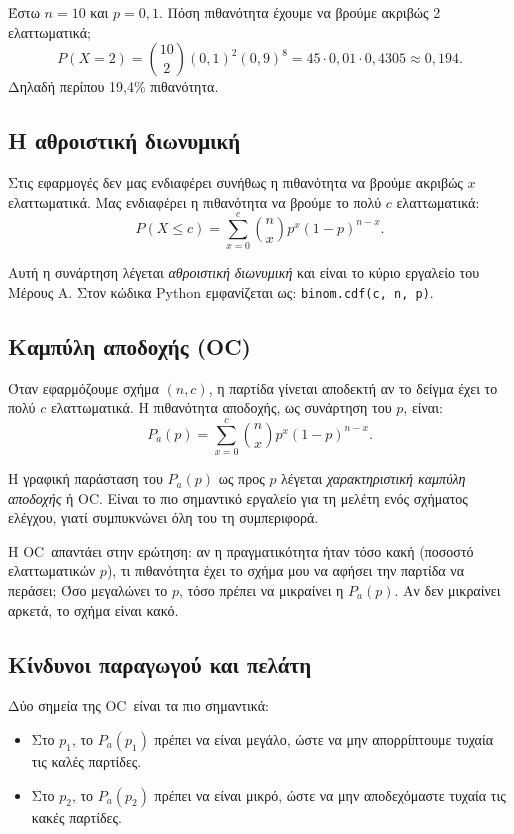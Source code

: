 \documentclass[12pt,a4paper]{article}
\newcommand{\code}[1]{\texttt{\textenglish{#1}}}
\newcommand{\Pa}{P_{\!a}}
\newcommand{\OC}{\textenglish{OC}}
\begin{document}
\begin{example}
Έστω \(n=10\) και \(p=0{,}1\). Πόση πιθανότητα έχουμε να βρούμε ακριβώς 2
ελαττωματικά;
\[
    P(X=2)=\binom{10}{2}(0{,}1)^2(0{,}9)^8
    =45\cdot 0{,}01\cdot 0{,}4305
    \approx 0{,}194.
\]
Δηλαδή περίπου 19,4\% πιθανότητα.
\end{example}

\subsection{Η αθροιστική διωνυμική}

Στις εφαρμογές δεν μας ενδιαφέρει συνήθως η πιθανότητα να βρούμε ακριβώς
\(x\) ελαττωματικά. Μας ενδιαφέρει η πιθανότητα να βρούμε το πολύ \(c\)
ελαττωματικά:
\[
    P(X\le c)=\sum_{x=0}^{c}\binom{n}{x}p^{x}(1-p)^{n-x}.
\]

Αυτή η συνάρτηση λέγεται \emph{αθροιστική διωνυμική} και είναι το κύριο
εργαλείο του Μέρους Α. Στον κώδικα Python εμφανίζεται ως:
\code{binom.cdf(c, n, p)}.

\subsection{Καμπύλη αποδοχής (OC)}

Όταν εφαρμόζουμε σχήμα \((n,c)\), η παρτίδα γίνεται αποδεκτή αν το δείγμα
έχει το πολύ \(c\) ελαττωματικά. Η πιθανότητα αποδοχής, ως συνάρτηση του
\(p\), είναι:
\[
    \Pa(p)=\sum_{x=0}^{c}\binom{n}{x}p^{x}(1-p)^{n-x}.
\]

Η γραφική παράσταση του \(\Pa(p)\) ως προς \(p\) λέγεται \emph{χαρακτηριστική
καμπύλη αποδοχής} ή \OC. Είναι το πιο σημαντικό εργαλείο για τη μελέτη ενός
σχήματος ελέγχου, γιατί συμπυκνώνει όλη του τη συμπεριφορά.

\begin{intuition}
Η \OC\ απαντάει στην ερώτηση: αν η πραγματικότητα ήταν τόσο κακή
(ποσοστό ελαττωματικών \(p\)), τι πιθανότητα έχει το σχήμα μου να αφήσει
την παρτίδα να περάσει; Όσο μεγαλώνει το \(p\), τόσο πρέπει να μικραίνει
η \(\Pa(p)\). Αν δεν μικραίνει αρκετά, το σχήμα είναι κακό.
\end{intuition}

\subsection{Κίνδυνοι παραγωγού και πελάτη}

Δύο σημεία της \OC\ είναι τα πιο σημαντικά:

\begin{itemize}[leftmargin=2.2em]
    \item Στο \(p_1\), το \(\Pa(p_1)\) πρέπει να είναι μεγάλο, ώστε να μην
    απορρίπτουμε τυχαία τις καλές παρτίδες.
    \item Στο \(p_2\), το \(\Pa(p_2)\) πρέπει να είναι μικρό, ώστε να μην
    αποδεχόμαστε τυχαία τις κακές παρτίδες.
\end{itemize}
\end{document}
